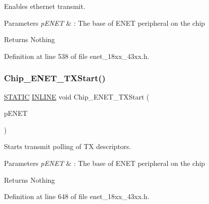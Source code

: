 Enables ethernet transmit. 


\begin{DoxyParams}{Parameters}
{\em p\+E\+N\+ET} & \+: The base of E\+N\+ET peripheral on the chip \\
\hline
\end{DoxyParams}
\begin{DoxyReturn}{Returns}
Nothing 
\end{DoxyReturn}


Definition at line 538 of file enet\+\_\+18xx\+\_\+43xx.\+h.

\mbox{\label{group___e_n_e_t__18_x_x__43_x_x_gadb075c919f1870edd00a1f86cc2504b3}} 
\subsubsection{\texorpdfstring{Chip\+\_\+\+E\+N\+E\+T\+\_\+\+T\+X\+Start()}{Chip\_ENET\_TXStart()}}
{\footnotesize\ttfamily \hyperlink{group___l_p_c___types___public___macros_ga10b2d890d871e1489bb02b7e70d9bdfb}{S\+T\+A\+T\+IC} \hyperlink{spifi__18xx__43xx_8h_a2eb6f9e0395b47b8d5e3eeae4fe0c116}{I\+N\+L\+I\+NE} void Chip\+\_\+\+E\+N\+E\+T\+\_\+\+T\+X\+Start (\begin{DoxyParamCaption}\item[{\hyperlink{struct_l_p_c___e_n_e_t___t}{L\+P\+C\+\_\+\+E\+N\+E\+T\+\_\+T} $\ast$}]{p\+E\+N\+ET }\end{DoxyParamCaption})}



Starts transmit polling of TX descriptors. 


\begin{DoxyParams}{Parameters}
{\em p\+E\+N\+ET} & \+: The base of E\+N\+ET peripheral on the chip \\
\hline
\end{DoxyParams}
\begin{DoxyReturn}{Returns}
Nothing 
\end{DoxyReturn}


Definition at line 648 of file enet\+\_\+18xx\+\_\+43xx.\+h.

